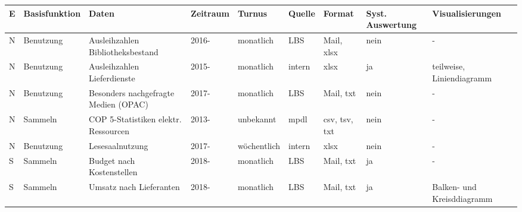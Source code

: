 \begin{table}[H]
    \centering
    \normalsize
    \begin{adjustbox}{max width=\textwidth}
    \begin{tabular}{p{}p{}p{}p{}p{}p{}p{}p{}p{}}
       \toprule
       \textbf{E\footnotemark} &\textbf{Basisfunktion}               &\textbf{Daten}                                 &\textbf{Zeitraum} &\textbf{Turnus}    &\textbf{Quelle}  &\textbf{Format}          &\textbf{Syst. Auswertung} & \textbf{Visualisierungen}\\
       \midrule     
            N         &Benutzung                      & Ausleihzahlen Bibliotheksbestand              & 2016-             & monatlich         & LBS          & Mail, xlsx                & nein  & -\\
            N         &Benutzung                      & Ausleihzahlen Lieferdienste                   & 2015-             & monatlich         & intern       & xlsx                      & ja    & teilweise, Liniendiagramm\\ 
            N         &Benutzung                      & Besonders nachgefragte Medien (OPAC)          & 2017-             & monatlich         & LBS          & Mail, txt                 & nein  & -\\ 
            N         &Sammeln                       &\acrshort{COP 5}-Statistiken elektr. Ressourcen& 2013-            & unbekannt                 & mpdl         & csv, tsv, txt             & nein  & -\\ 
            N         &Benutzung                      & Lesesaalnutzung                               & 2017-             & wöchentlich       & intern       & xlsx                      & nein  & -\\ 
            S         &Sammeln                       & Budget nach Kostenstellen                   & 2018-               & monatlich         & LBS          & Mail, txt                 & ja    & -\\ 
            S         &Sammeln                       & Umsatz nach Lieferanten                     & 2018-               & monatlich         & LBS          & Mail, txt                 & ja    & Balken- und Kreisddiagramm\\ 

\end{tabular}
\end{adjustbox}
\end{table}
